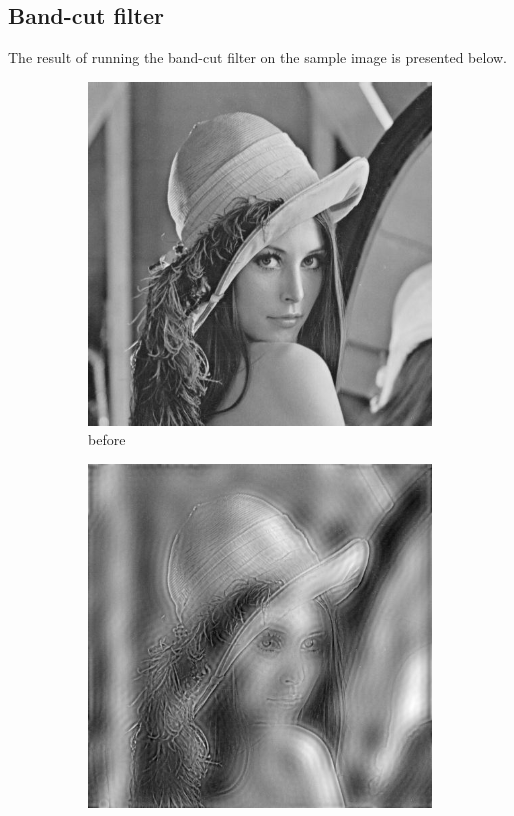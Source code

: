\documentclass[12pt]{article}
\begin{document}
\subsection{Band-cut filter}
The result of running the band-cut filter on the sample image is presented below.
\begin{figure}[H]\centering
    \begin{subfigure}[t]{\subfiguresize}\centering
        \includegraphics[width=\textwidth]{img/lena.png}
        \caption{before}
    \end{subfigure}
    \hspace{2em}
    \begin{subfigure}[t]{\subfiguresize}\centering
        \includegraphics[width=\textwidth]{img/lena_bandcut.png}

\end{subfigure}
\end{figure}
\end{document}
